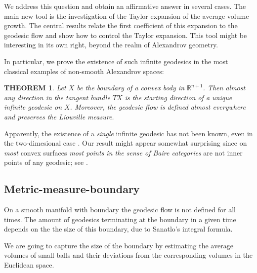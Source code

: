 \documentclass[12pt,leqno,intlimits]{amsart}
\numberwithin{equation}{section}
\newtheorem{thm}{THEOREM}[section]
\theoremstyle{definition}
\theoremstyle{remark}
\begin{document}
We address this question and obtain an affirmative answer in several cases.
 The main new tool is the investigation of  the Taylor expansion of the average volume growth.
The central results relate the first coefficient of this expansion to  the geodesic flow and show how to control
the Taylor expansion. This tool  might be interesting in its own right, beyond the realm of Alexandrov geometry.

In particular, we prove the existence of such infinite geodesics in the most classical examples of non-smooth Alexandrov spaces:

\begin{thm} \label{thmfirst}
Let $X$ be the boundary of a convex body in $\mathbb R^{n+1}$.
Then almost any direction in the tangent bundle $TX$
is the starting direction of a unique infinite geodesic on $X$.
Moreover, the geodesic flow is defined almost everywhere and preserves the Liouville measure.
\end{thm}

Apparently, the existence of a \emph{single} infinite geodesic has not been known, even in the two-dimesional case \cite{Zam-quest}.
Our result might appear somewhat
 surprising
since on \emph{most} convex surfaces \emph{most points in the sense of Baire categories} are not inner points of any geodesic;
see \cite{Zam-inv}.

\subsection{Metric-measure-boundary}
On a smooth manifold with boundary the geodesic flow is not defined for all times. The amount of geodesics terminating at the boundary in a given time depends on the the size of this boundary,  due to Sanatlo's integral  formula.

 We are going to capture the size of the boundary by estimating the average volumes of small balls and their deviations from the corresponding volumes in the Euclidean space.
\end{document}
